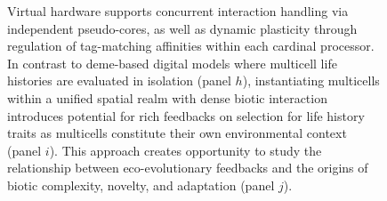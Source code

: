 \begin{figure}
{Virtual hardware supports concurrent interaction handling via independent pseudo-cores, as well as dynamic plasticity through regulation of tag-matching affinities within each cardinal processor.
In contrast to deme-based digital models where multicell life histories are evaluated in isolation \citep{goldsby2012task, goldsby2014evolutionary} (panel $h$), instantiating multicells within a unified spatial realm with dense biotic interaction introduces potential for rich feedbacks on selection for life history traits as multicells constitute their own environmental context (panel $i$).
This approach creates opportunity to study the relationship between eco-evolutionary feedbacks and the origins of biotic complexity, novelty, and adaptation (panel $j$).
}
\label{fig:overview-supp}
\end{figure}
